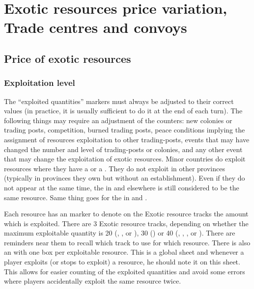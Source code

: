 
\section{Exotic resources price variation, Trade centres and convoys}

\label{chExpenses:Variation}



\subsection{Price of exotic resources}

\label{chExpenses:ExoticResourcesPrices}


\subsubsection{Exploitation level}
 The ``exploited quantities'' markers must
always be adjusted to their correct values (in practice, it is usually
sufficient to do it at the end of each turn).
\bparag The following things may require an adjustment of the counters: new
colonies or trading posts, competition, burned trading posts, peace conditions
implying the assignment of resources exploitation to other trading-posts,
events that may have changed the number and level of trading-posts or
colonies, and any other event that may change the exploitation of exotic
resources.
\bparag Minor \ROTW countries do exploit resources where they have a \TP or a
\COL. They do not exploit in other provinces (typically in provinces they own
but without an establishment).
\bparag Even if they do not appear at the same time, the  in
 and elsewhere is still considered to be the same
resource. Same thing goes for the  in  and
.

 Each resource has an  marker to denote on the Exotic resource tracks the amount which is
exploited.
\bparag There are 3 Exotic resource tracks, depending on whether the maximum
exploitable quantity is 20 (, , 
or ), 30 () or 40 (, ,
,  or ). There are reminders near them to
recall which track to use for which resource.
\bparag There is also an  with one box per
exploitable resource. This is a global sheet and whenever a player exploits
(or stops to exploit) a resource, he should note it on this sheet. This allows
for easier counting of the exploited quantities and avoid some errors where
players accidentally exploit the same resource twice.

